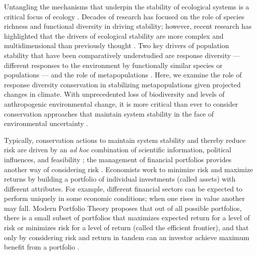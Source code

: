 \documentclass[12pt,english]{article}
\begin{document}
\begin{spacing}{1.9}
Untangling the mechanisms that underpin the stability of ecological systems is a critical focus of ecology \citep[e.g.][]{ives2007, demazancourt2013}. Decades of research has focused on the role of species richness and functional diversity in driving stability; however, recent research has highlighted that the drivers of ecological stability are more complex and multidimensional than previously thought \citep[e.g.][]{balvanera2006, ives2007, demazancourt2013}. Two key drivers of population stability that have been comparatively understudied are response diversity \citep{winfree2009, mori2013} --- different responses to the environment by functionally similar species or populations \citep{elmqvist2003} --- and the role of metapopulations \citep{schtickzelle2007}. Here, we examine the role of response diversity conservation in stabilizing metapopulations given projected changes in climate. With unprecedented loss of biodiversity and levels of anthropogenic environmental change, it is more critical than ever to consider conservation approaches that maintain system stability in the face of environmental uncertainty \citep{lee2008, ando2012}.

Typically, conservation actions to maintain system stability and thereby reduce risk are driven by an \emph{ad hoc} combination of scientific information, political influences, and feasibility \citep{margules2000}; the management of financial portfolios provides another way of considering risk \citep[e.g.][]{figge2004, koellner2006, ando2012, haak2012}. Economists work to minimize risk and maximize returns by building a portfolio of individual investments (called assets) with different attributes. For example, different financial sectors can be expected to perform uniquely in some economic conditions; when one rises in value another may fall. Modern Portfolio Theory proposes that out of all possible portfolios, there is a small subset of portfolios that maximizes expected return for a level of risk or minimizes risk for a level of return (called the efficient frontier), and that only by considering risk and return in tandem can an investor achieve maximum benefit from a portfolio \citep{markowitz1952}.


\end{spacing}
\end{document}
